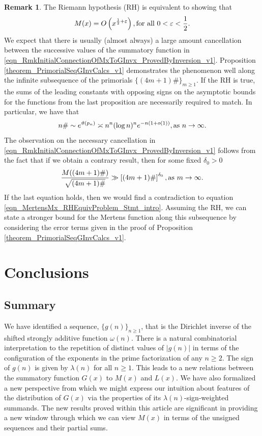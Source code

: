 \documentclass[11pt,reqno,a4letter]{article}
\newcommand{\hlocalref}[1]{\hyperref[#1]{\ref{#1}}}
\numberwithin{equation}{section}
\numberwithin{figure}{section}
\numberwithin{table}{section}
\theoremstyle{plain}
\numberwithin{theorem}{section}
\theoremstyle{definition}
\newtheorem{remark}[theorem]{Remark}
\theoremstyle{remark}
\newcommand{\mathtext}[1]{\text{\rm #1}}
\begin{document}
\begin{remark}
\label{remark_LocalCancellationWithGxAlongThePrimorialsUnderTheRH} 
The Riemann hypothesis (RH) is equivalent to showing that 
\begin{equation} 
\label{eqn_MertensMx_RHEquivProblem_Stmt_intro} 
M(x) = O\left(x^{\frac{1}{2}+\varepsilon}\right), \mathtext{ for all } 0 < \varepsilon < \frac{1}{2}.
\end{equation}
We expect that there is usually (almost always) 
a large amount cancellation between the successive 
values of the summatory function in 
\eqref{eqn_RmkInitialConnectionOfMxToGInvx_ProvedByInversion_v1}. 
Proposition \hlocalref{theorem_PrimorialSeqGInvCalcs_v1} 
demonstrates the phenomenon well along the infinite 
subsequence of the primorials $\{(4m+1)\#\}_{m \geq 1}$. 
If the RH is true, the sums of the leading constants with opposing signs 
on the asymptotic bounds for the functions from the last proposition 
are necessarily required to match. 
In particular, we have that 
\cite{DUSART-1999,DUSART-2010} 
\[
n\# \sim e^{\vartheta(p_n)} \asymp n^n (\log n)^n e^{-n(1+o(1))}, 
     \mathtext{ as } n \rightarrow \infty. 
\]
The observation on the necessary cancellation in 
\eqref{eqn_RmkInitialConnectionOfMxToGInvx_ProvedByInversion_v1}
follows from the fact that if we obtain a contrary result, 
then for some fixed $\delta_0 > 0$
\[
\frac{M((4m+1)\#)}{\sqrt{(4m+1)\#}} \gg \left[(4m+1)\#\right]^{\delta_0}, 
     \mathtext{ as } m \rightarrow \infty. 
\]
If the last equation holds, then we would find a contradiction to 
equation \eqref{eqn_MertensMx_RHEquivProblem_Stmt_intro}. 
Assuming the RH, we can state a stronger bound for the 
Mertens function along this subsequence by considering the 
error terms given in the proof of 
Proposition \hlocalref{theorem_PrimorialSeqGInvCalcs_v1}. 
\end{remark}

\section{Conclusions}

\subsection{Summary}

We have identified a sequence, 
$\{g(n)\}_{n \geq 1}$, that is the Dirichlet inverse of the 
shifted strongly additive function $\omega(n)$. 
There is a natural 
combinatorial interpretation to the repetition of distinct values 
of $|g(n)|$ in terms of the configuration of the 
exponents in the prime factorization of any $n \geq 2$. 
The sign of $g(n)$ is given by $\lambda(n)$ for all $n \geq 1$. 
This leads to a new relations between the 
summatory function $G(x)$ to $M(x)$ and $L(x)$. 
We have also formalized a new perspective from which we might express 
our intuition about features of the distribution of $G(x)$ 
via the properties of its $\lambda(n)$-sign-weighted summands.
The new results proved within this article 
are significant in providing a new window through which we can view $M(x)$ 
in terms of the unsigned sequences and their partial sums. 
\end{document}
